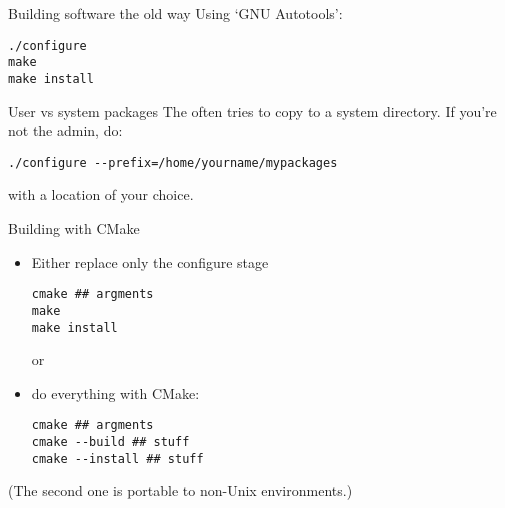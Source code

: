 
\lstset{language=bash}

\begin{numberedframe}{Building software the old way}
  Using `GNU Autotools':
\begin{verbatim}
./configure
make
make install
\end{verbatim}
\end{numberedframe}

\begin{numberedframe}{User vs system packages}
  The  often tries to copy
  to a system directory. If you're not the admin, do:
\begin{verbatim}
./configure --prefix=/home/yourname/mypackages
\end{verbatim}
with a location of your choice.
\end{numberedframe}

\begin{numberedframe}{Building with CMake}
  \begin{itemize}
  \item Either replace only the configure stage
\begin{lstlisting}
cmake ## argments
make
make install
\end{lstlisting}
or
  \item do everything with CMake:
\begin{lstlisting}
cmake ## argments
cmake --build ## stuff
cmake --install ## stuff
\end{lstlisting}
  \end{itemize}
(The second one is portable to non-Unix environments.)
\end{numberedframe}

